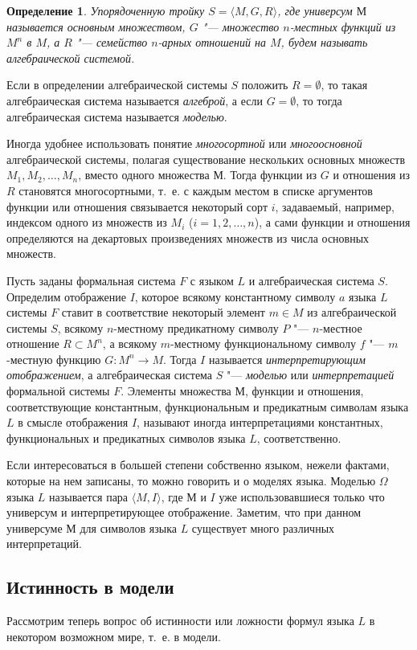 \documentclass[b5paper,11pt]{book}
\newtheorem{Def}{Определение}
\numberwithin{Def}{section}
\numberwithin{Th}{chapter}
\numberwithin{St}{chapter}
\begin{document}
	\begin{Def}
		Упорядоченную тройку  $S=\langle M, G, R\rangle$, где универсум $М$ называется основным множеством, $G$ "--- множество $n$-местных функций из $M^n$ в $M$, а $R$ "--- семейство $n$-арных отношений на $M$, будем называть алгебраической системой. 
	\end{Def}
	Если в определении алгебраической системы $S$ положить $R=\emptyset$, то такая алгебраическая система называется \textit{алгеброй}, а если $G=\emptyset$, то тогда алгебраическая система называется \textit{моделью}. 
	
	Иногда удобнее использовать  понятие \textit{многосортной} или \textit{многоосновной} алгебраической системы, полагая  существование нескольких основных множеств $M_1,M_2,\dots,M_n$, вместо одного множества $М$. Тогда функции из $G$ и отношения из $R$ становятся многосортными, т.~е. с каждым местом в списке аргументов функции или отношения связывается  некоторый сорт $i$, задаваемый, например, индексом одного из множеств из $M_i$ ($i=1,2,\dots,n$), а сами функции и отношения определяются на декартовых произведениях множеств из числа основных множеств.
	
	Пусть заданы формальная система $F$ с языком $L$ и алгебраическая система $S$. Определим  отображение $I$, которое всякому константному символу $a$ языка $L$ системы $F$ ставит в соответствие некоторый элемент $m\in M$ из алгебраической системы $S$, всякому $n$-местному предикатному символу $P$ "--- $n$-местное отношение $R\subset M^n$, а всякому $m$-местному функциональному символу $f$ "--- $m$-местную функцию $G:M^n\rightarrow M$. Тогда $I$ называется \textit{интерпретирующим отображением}, а  алгебраическая система $S$ "--- \textit{моделью} или \textit{интерпретацией} формальной системы $F$. Элементы множества $М$, функции и отношения, соответствующие константным, функциональным и предикатным символам языка $L$ в смысле отображения $I$, называют иногда интерпретациями константных, функциональных и предикатных  символов языка $L$, соответственно.
	
	Если интересоваться в большей степени собственно языком, нежели фактами, которые на нем записаны, то можно говорить и о моделях языка. Моделью $\Omega$ языка $L$ называется  пара $\langle M, I\rangle$, где $М$ и $I$ уже использовавшиеся только что универсум и интерпретирующее отображение. Заметим, что при данном универсуме $М$ для символов языка $L$ существует много различных интерпретаций.
	
	\subsection{Истинность в модели}
	Рассмотрим теперь вопрос об истинности или ложности формул языка $L$ в некотором возможном мире, т.~е. в модели. 
	
\end{document}
